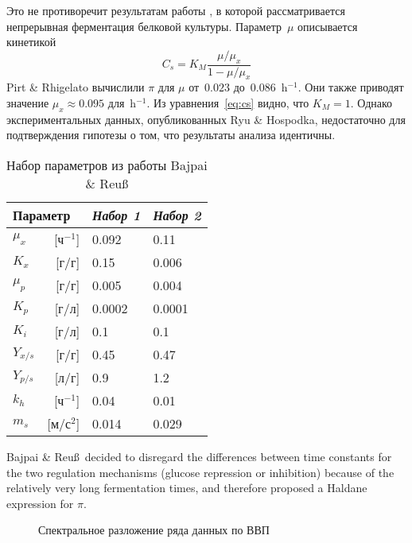 \documentclass[final,pdftex]{epsilonj}
\numberwithin{equation}{section}
\begin{document}
Это не противоречит результатам работы \cite{risch70}, в которой рассматривается непрерывная ферментация белковой культуры. Параметр~$\mu$ описывается кинетикой
\begin{equation}\label{eq:cs}
    C_{s}  =  K_{M} \frac{\mu/\mu_{x}}{1-\mu/\mu_{x}} 
\end{equation}
Pirt \& Rhigelato вычислили $\pi$ для $\mu$ от~$0.023$ до~$0.086$~h$^{-1}$. Они также приводят значение $\mu_{x} \approx 0.095$ для~h$^{-1}$. Из уравнения~\eqref{eq:cs} видно, что $K_{M}=1$. Однако экспериментальных данных, опубликованных Ryu \& Hospodka, недостаточно для подтверждения гипотезы о том, что результаты анализа идентичны.

\begin{table}
\centering
\begin{tabular}{lrll}
\toprule
\multicolumn{2}{l}{Параметр} & {\it Набор 1} & {\it Набор 2}\\
\midrule
$\mu_{x}$           & [ч$^{-1}$]  & 0.092       & 0.11          \\
$K_{x}$             & [г/г]     & 0.15        & 0.006         \\
$\mu_{p}$           & [г/г]  & 0.005       & 0.004         \\
$K_{p}$             & [г/л]        & 0.0002      & 0.0001        \\
$K_{i}$             & [г/л]        & 0.1         & 0.1           \\
$Y_{x/s}$           & [г/г]     & 0.45        & 0.47          \\
$Y_{p/s}$           & [л/г]        & 0.9         & 1.2           \\
$k_{h}$             & [ч$^{-1}$]  & 0.04        & 0.01          \\
$m_{s}$             & [м/с${}^2$]  & 0.014       & 0.029         \\
\bottomrule
\end{tabular}
\caption{Набор параметров из работы Bajpai \& Reu\ss}\label{tab:parset}
\end{table}

Bajpai \& Reu\ss\ decided to disregard the
differences between time constants for the two regulation mechanisms
(glucose repression or inhibition) because of the
relatively very long fermentation times, and therefore proposed a Haldane
expression for $\pi$.


\begin{figure} \centering
{}
\caption{Спектральное разложение ряда данных по ВВП}
\label{penG}
\end{figure}
\end{document}
